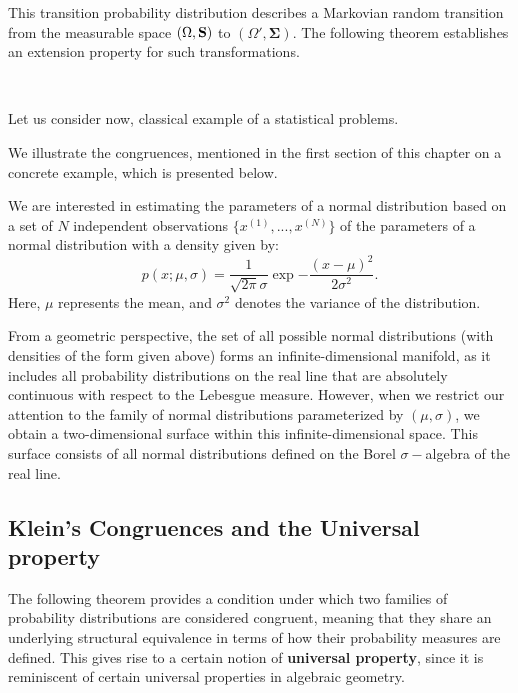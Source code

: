 This transition probability distribution describes a Markovian random transition from the measurable space $(\Omega, \mathbf{S})$ to $(\Omega', \mathbf{\Sigma})$. The following theorem establishes an extension property for such transformations.

\,

    Let us consider now, classical example of a statistical problems.


We illustrate the congruences, mentioned in the first section of this chapter on a concrete example, which is presented below. 

\begin{example}
 We are interested in estimating the parameters of a normal distribution based on a set of $N$ independent observations $\{x^{(1)},...,x^{(N)}\}$ of  the parameters of a normal distribution with a density given by:
\[
p(x;\mu,\sigma)= \frac{1}{\sqrt{2 \pi} \sigma} \exp{ - \frac{(x-\mu)^2}{2\sigma^2}}.
\]  
Here, 
$\mu$ represents the mean, and 
$\sigma^2$ denotes the variance of the distribution.

From a geometric perspective, the set of all possible normal distributions (with densities of the form given above) forms an infinite-dimensional manifold, as it includes all probability distributions on the real line that are absolutely continuous with respect to the Lebesgue measure. However, when we restrict our attention to the family of normal distributions parameterized by $(\mu,\sigma)$, we obtain a two-dimensional surface within this infinite-dimensional space. This surface consists of all normal distributions defined on the Borel 
$\sigma-$algebra of the real line.
\end{example}

\subsection{Klein's Congruences and the Universal property}
The following theorem provides a condition under which two families of probability distributions are considered congruent, meaning that they share an underlying structural equivalence in terms of how their probability measures are defined. This  gives rise to a certain notion of {\bf universal property}, since it is reminiscent of certain  universal properties in algebraic geometry. 

